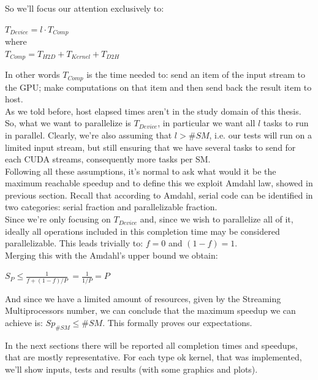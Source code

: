 So we'll focus our attention exclusively to:
\begin{center}
	\(T_{Device} = l \cdot T_{Comp}\)\\
	where\\
	\(T_{Comp}= T_{H2D} + T_{Kernel} + T_{D2H}\)\\
\end{center}
In other words \(T_{Comp}\) is the time needed to: send an item of the input stream to the GPU; make computations on that item and then send back the result item to host.\\
As we told before, host elapsed times aren't in the study domain of this thesis. So, what we want to parallelize is \(T_{Device}\), in particular we want all \(l\) tasks to run in parallel. Clearly, we're also assuming that \(l > \#SM\), i.e. our tests will run on a limited input stream, but still ensuring that we have several tasks to send for each CUDA streams, consequently more tasks per SM.\\
Following all these assumptions, it's normal to ask what would it be the maximum reachable speedup and to define this we exploit Amdahl law, showed in previous section. Recall that according to Amdahl, serial code can be identified in two categories: serial fraction and parallelizable fraction.\\
Since we're only focusing on \(T_{Device}\) and, since we wish to parallelize all of it, ideally all operations included in this completion time may be considered parallelizable. This leads trivially to: \(f=0\) and  \((1-f)=1\).\\
Merging this with the Amdahl's upper bound we obtain:
\begin{center}
		\(S_{P} \leq \frac{1}{f+(1-f)/P}\   = \frac{1}{1/P}=P\)
\end{center}
And since we have a limited amount of resources, given by the Streaming Multiprocessors number, we can conclude that the maximum speedup we can achieve is: \(Sp_{\#SM} \leq \#SM\). This formally proves our expectations.


In the next sections there will be reported all completion times and speedups, that are mostly representative. 
For each type ok kernel, that was implemented,  we'll show inputs, tests and results (with some graphics and plots).



